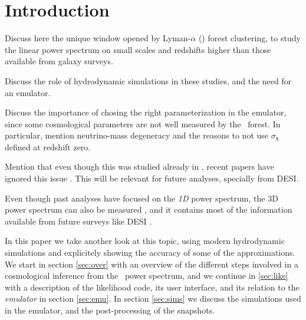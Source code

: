 \section{Introduction} 

Discuss here the unique window opened by Lyman-$\alpha$ (\lya) forest 
clustering, to study the linear power spectrum on small scales and redshifts 
higher than those available from galaxy surveys.

Discuss the role of hydrodynamic simulations in these studies, and the need 
for an emulator.

Discuss the importance of chosing the right parameterization in the emulator, 
since some cosmological parameters are not well measured by the \lya\ forest.
In particular, mention neutrino-mass degeneracy and the reasons to not use 
$\sigma_8$ defined at redshift zero.

Mention that even though this was studied already in \cite{McDonald2005a}, 
recent papers have ignored this issue \cite{Palanque-Delabrouille2015,
Yeche2017}. 
This will be relevant for future analyses, specially from DESI.

Even though past analyses have focused on the \textit{1D} power spectrum, 
the 3D power spectrum can also be measured \cite{Font-Ribera2018}, 
and it contains most of the information available from future surveys 
like DESI \cite{Font-Ribera2014}. 


In this paper we take another look at this topic, using modern hydrodynamic 
simulations and explicitely showing the accuracy of some of the approximations.
We start in section \ref{sec:over} with an overview of the different steps 
involved in a cosmological inference from the \lya\ power spectrum, and we 
continue in \ref{sec:like} with a description of the likelihood code, 
its user interface, and its relation to the \textit{emulator} in section
\ref{sec:emu}.
In section \ref{sec:sims} we discuss the simulations used in the emulator, 
and the post-processing of the snapshots. 
 
